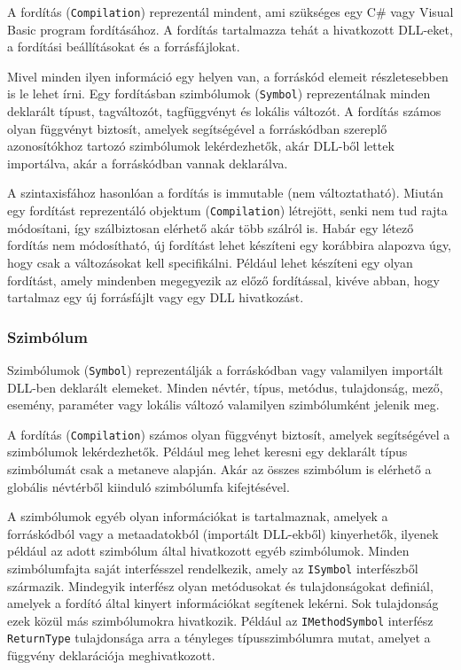 \documentclass[12pt, a4paper]{report}
\newcommand{\f}[1]{\texttt{#1}}
\begin{document}
A fordítás (\f{Compilation}) reprezentál mindent, ami szükséges egy C\# vagy Visual Basic program fordításához. A fordítás tartalmazza tehát a hivatkozott DLL-eket, a fordítási beállításokat és a forrásfájlokat.

Mivel minden ilyen információ egy helyen van, a forráskód elemeit részletesebben is le lehet írni. Egy fordításban szimbólumok (\f{Symbol}) reprezentálnak minden deklarált típust, tagváltozót, tagfüggvényt és lokális változót. A fordítás számos olyan függvényt biztosít, amelyek segítségével a forráskódban szereplő azonosítókhoz tartozó szimbólumok lekérdezhetők, akár DLL-ből lettek importálva, akár a forráskódban vannak deklarálva.

A szintaxisfához hasonlóan a fordítás is immutable (nem változtatható). Miután egy fordítást reprezentáló objektum (\f{Compilation}) létrejött, senki nem tud rajta módosítani, így szálbiztosan elérhető akár több szálról is. Habár egy létező fordítás nem módosítható, új fordítást lehet készíteni egy korábbira alapozva úgy, hogy csak a változásokat kell specifikálni. Például lehet készíteni egy olyan fordítást, amely mindenben megegyezik az előző fordítással, kivéve abban, hogy tartalmaz egy új forrásfájlt vagy egy DLL hivatkozást.

\subsubsection{Szimbólum}

Szimbólumok (\f{Symbol}) reprezentálják a forráskódban vagy valamilyen importált DLL-ben deklarált elemeket. Minden névtér, típus, metódus, tulajdonság, mező, esemény, paraméter vagy lokális változó valamilyen szimbólumként jelenik meg.

A fordítás (\f{Compilation}) számos olyan függvényt biztosít, amelyek segítségével a szimbólumok lekérdezhetők. Például meg lehet keresni egy deklarált típus szimbólumát csak a metaneve alapján. Akár az összes szimbólum is elérhető a globális névtérből kiinduló szimbólumfa kifejtésével.

A szimbólumok egyéb olyan információkat is tartalmaznak, amelyek a forráskódból vagy a metaadatokból (importált DLL-ekből) kinyerhetők, ilyenek például az adott szimbólum által hivatkozott egyéb szimbólumok. Minden szimbólumfajta saját interfésszel rendelkezik, amely az \f{ISymbol} interfészből származik. Mindegyik interfész olyan metódusokat és tulajdonságokat definiál, amelyek a fordító által kinyert információkat segítenek lekérni. Sok tulajdonság ezek közül más szimbólumokra hivatkozik. Például az \f{IMethodSymbol} interfész \f{ReturnType} tulajdonsága arra a tényleges típusszimbólumra mutat, amelyet a függvény deklarációja meghivatkozott.
\end{document}
